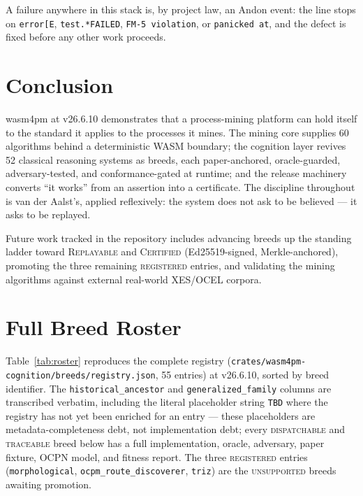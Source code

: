\documentclass[11pt,oneside]{report}
\newcommand{\projver}{v26.6.10}
\begin{document}
A failure anywhere in this stack is, by project law, an Andon event: the
line stops on \texttt{error[E}, \texttt{test.*FAILED}, \texttt{FM-5
violation}, or \texttt{panicked at}, and the defect is fixed before any
other work proceeds.

\chapter{Conclusion}
\label{ch:conclusion}

wasm4pm at \projver{} demonstrates that a process-mining platform can hold
itself to the standard it applies to the processes it mines. The mining
core supplies 60 algorithms behind a deterministic WASM boundary; the
cognition layer revives 52 classical reasoning systems as breeds, each
paper-anchored, oracle-guarded, adversary-tested, and conformance-gated at
runtime; and the release machinery converts ``it works'' from an assertion
into a certificate. The discipline throughout is van der Aalst's, applied
reflexively: the system does not ask to be believed --- it asks to be
replayed.

Future work tracked in the repository includes advancing breeds up the
standing ladder toward \textsc{Replayable} and \textsc{Certified}
(Ed25519-signed, Merkle-anchored), promoting the three remaining
\textsc{registered} entries, and validating the mining algorithms against
external real-world XES/OCEL corpora.

\appendix
\chapter{Full Breed Roster}
\label{app:roster}

Table~\ref{tab:roster} reproduces the complete registry
(\texttt{crates/wasm4pm-cognition/breeds/registry.json}, 55 entries) at
\projver{}, sorted by breed identifier. The \texttt{historical\_ancestor}
and \texttt{generalized\_family} columns are transcribed verbatim,
including the literal placeholder string \texttt{TBD} where the registry
has not yet been enriched for an entry --- these placeholders are
metadata-completeness debt, not implementation debt; every
\textsc{dispatchable} and \textsc{traceable} breed below has a full
implementation, oracle, adversary, paper fixture, OCPN model, and fitness
report. The three \textsc{registered} entries (\texttt{morphological},
\texttt{ocpm\_route\_discoverer}, \texttt{triz}) are the
\textsc{unsupported} breeds awaiting promotion.
\end{document}
